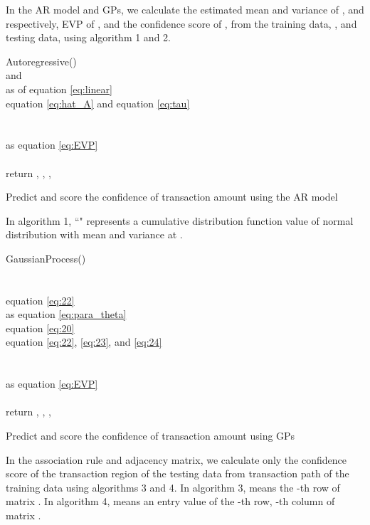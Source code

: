 \documentclass[final,authoryear,5p,times,twocolumn]{elsarticle}
\begin{document}
In the AR model and GPs, we calculate the estimated mean and variance of ,  and  respectively, EVP of ,  and the confidence score of ,  from the training data, , and testing data,  using algorithm 1 and 2.
\begin{algorithm}[h!]
Autoregressive() \\
 and \\
 as  of equation \eqref{eq:linear} \\
 equation \eqref{eq:hat_A} and  equation \eqref{eq:tau} \\
 \\
 \\
 as equation \eqref{eq:EVP} \\
 \\
return , , , 
\caption{Predict and score the confidence of transaction amount using the AR model}
\end{algorithm}

In algorithm 1, ``" represents a cumulative distribution function value of normal distribution with mean  and variance  at .

\begin{algorithm}[h]
GaussianProcess() \\
 \\
 \\
 equation \eqref{eq:22} \\
 as equation \eqref{eq:para_theta}\\
 equation \eqref{eq:20} \\
 equation \eqref{eq:22}, \eqref{eq:23}, and \eqref{eq:24} \\
 \\
 \\
 as equation \eqref{eq:EVP} \\
 \\
return , , , 
\caption{Predict and score the confidence of transaction amount using GPs}
\end{algorithm}

In the association rule and adjacency matrix, we calculate only the confidence score  of the transaction region  of the testing data from transaction path  of the training data using algorithms 3 and 4. In algorithm 3,  means the -th row of matrix . In algorithm 4,  means an entry value of the -th row, -th column of matrix .
\end{document}
